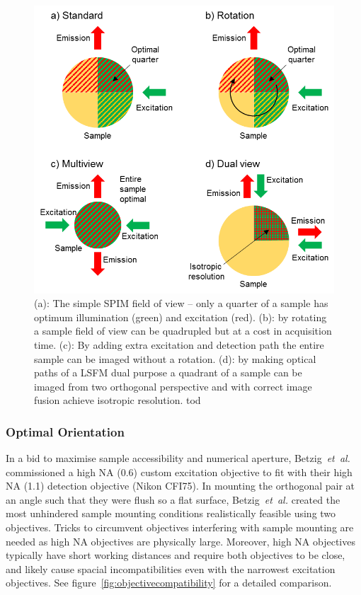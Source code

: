 \begin{figure}
	\centering
	\includegraphics[width=\columnwidth]{spim_optimal_imaging.png}
	\caption{
	(a): The simple SPIM field of view – only a quarter of a sample has optimum illumination (green) and excitation (red).
	(b): by rotating a sample field of view can be quadrupled but at a cost in acquisition time.
	(c): By adding extra excitation and detection path the entire sample can be imaged without a rotation.
	(d): by making optical paths of a LSFM dual purpose a quadrant of a sample can be imaged from two orthogonal perspective and with correct image fusion achieve isotropic resolution.
	tod}
	\label{spim_optimal_imaging}
\end{figure}

\subsubsection{Optimal Orientation}

In a bid to maximise sample accessibility and numerical aperture, Betzig~\emph{et~al.}~\cite{chen_lattice_2014} commissioned a high NA (0.6) custom excitation objective to fit with their high NA (1.1) detection objective (Nikon CFI75).
In mounting the orthogonal pair at an angle such that they were flush so a flat surface, Betzig~\emph{et~al.} created the most unhindered sample mounting conditions realistically feasible using two objectives.
Tricks to circumvent objectives interfering with sample mounting are needed as high NA objectives are physically large.
Moreover,  high NA objectives typically have short working distances and require both objectives to be close, and likely cause spacial incompatibilities even with the narrowest excitation objectives.
See figure~\ref{fig:objectivecompatibility} for a detailed comparison.

